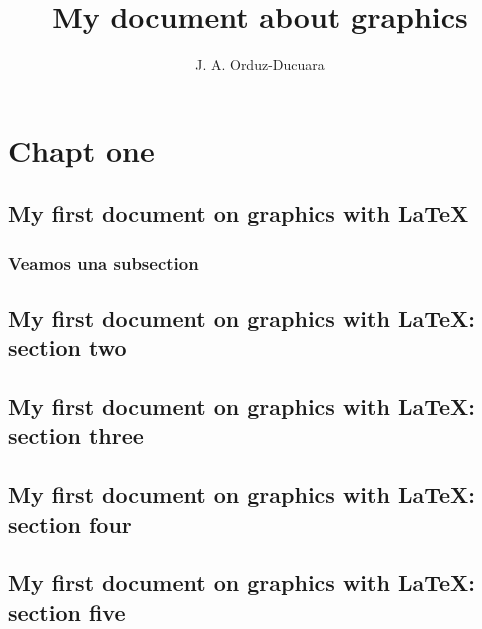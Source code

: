 \documentclass{book}
\title{My document about graphics}
\author{J. A. Orduz-Ducuara}
\begin{document}
\maketitle
\tableofcontents
\chapter{Chapt one}

\section{My first document on graphics with \LaTeX}

\subsection{Veamos una subsection}

\section{My first document on graphics with \LaTeX: section two}


\section{My first document on graphics with \LaTeX: section three}

\section{My first document on graphics with \LaTeX: section four}

\section{My first document on graphics with \LaTeX: section five}
\end{document}
